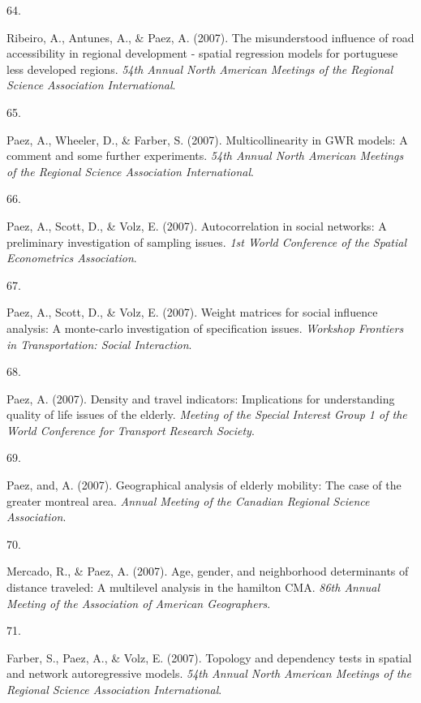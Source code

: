 \documentclass[10pt,a4paper,]{twentysecondcv}
\newlength{\csllabelwidth}
\newcommand{\CSLLeftMargin}[1]{\parbox[t]{\csllabelwidth}{#1}}
\newcommand{\CSLRightInline}[1]{\parbox[t]{\linewidth - \csllabelwidth}{#1}}
\begin{document}
\leavevmode{}%
\CSLLeftMargin{64. }%
\CSLRightInline{Ribeiro, A., Antunes, A., \& Paez, A. (2007). The
misunderstood influence of road accessibility in regional development -
spatial regression models for portuguese less developed regions.
\emph{54th Annual North American Meetings of the Regional Science
Association International}.}

\leavevmode{}%
\CSLLeftMargin{65. }%
\CSLRightInline{Paez, A., Wheeler, D., \& Farber, S. (2007).
Multicollinearity in GWR models: A comment and some further experiments.
\emph{54th Annual North American Meetings of the Regional Science
Association International}.}

\leavevmode{}%
\CSLLeftMargin{66. }%
\CSLRightInline{Paez, A., Scott, D., \& Volz, E. (2007). Autocorrelation
in social networks: A preliminary investigation of sampling issues.
\emph{1st World Conference of the Spatial Econometrics Association}.}

\leavevmode{}%
\CSLLeftMargin{67. }%
\CSLRightInline{Paez, A., Scott, D., \& Volz, E. (2007). Weight matrices
for social influence analysis: A monte-carlo investigation of
specification issues. \emph{Workshop Frontiers in Transportation: Social
Interaction}.}

\leavevmode{}%
\CSLLeftMargin{68. }%
\CSLRightInline{Paez, A. (2007). Density and travel indicators:
Implications for understanding quality of life issues of the elderly.
\emph{Meeting of the Special Interest Group 1 of the World Conference
for Transport Research Society}.}

\leavevmode{}%
\CSLLeftMargin{69. }%
\CSLRightInline{Paez, and, A. (2007). Geographical analysis of elderly
mobility: The case of the greater montreal area. \emph{Annual Meeting of
the Canadian Regional Science Association}.}

\leavevmode{}%
\CSLLeftMargin{70. }%
\CSLRightInline{Mercado, R., \& Paez, A. (2007). Age, gender, and
neighborhood determinants of distance traveled: A multilevel analysis in
the hamilton CMA. \emph{86th Annual Meeting of the Association of
American Geographers}.}

\leavevmode{}%
\CSLLeftMargin{71. }%
\CSLRightInline{Farber, S., Paez, A., \& Volz, E. (2007). Topology and
dependency tests in spatial and network autoregressive models.
\emph{54th Annual North American Meetings of the Regional Science
Association International}.}
\end{document}

